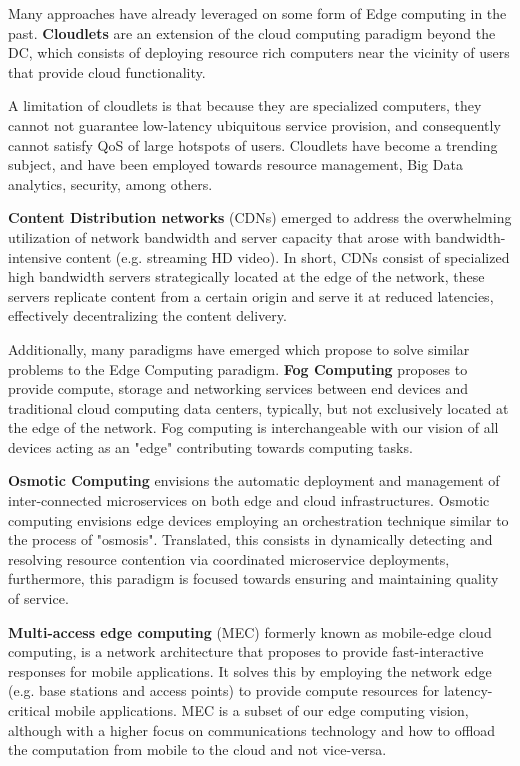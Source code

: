 Many approaches have already leveraged on some form of Edge computing in the past. \textbf{Cloudlets} \cite{10.1145/2307849.2307858} are an extension of the cloud computing paradigm beyond the DC, which consists of deploying resource rich computers near the vicinity of users that provide cloud functionality.

A limitation of cloudlets is that because they are specialized computers, they cannot not guarantee low-latency ubiquitous service provision, and consequently cannot satisfy QoS of large hotspots of users. Cloudlets have become a trending subject, and have been employed towards resource management, Big Data analytics, security, among others.

\textbf{Content Distribution networks} \cite{peng2004cdn} (CDNs) emerged to address the overwhelming utilization of network bandwidth and server capacity that arose with bandwidth-intensive content (e.g. streaming HD video). In short, CDNs consist of specialized high bandwidth servers strategically located at the edge of the network, these servers replicate content from a certain origin and serve it at reduced latencies, effectively decentralizing the content delivery. 

Additionally, many paradigms have emerged which propose to solve similar problems to the Edge Computing paradigm. \textbf{Fog Computing} \cite{bonomi2012fog} proposes to provide compute, storage and networking services between end devices and traditional cloud computing data centers, typically, but not exclusively located at the edge of the network. Fog computing is interchangeable with our vision of all devices acting as an "edge" contributing towards computing tasks.

\textbf{Osmotic Computing} \cite{villari2016osmotic} envisions the automatic deployment and management of inter-connected microservices on both edge and cloud infrastructures. Osmotic computing envisions edge devices employing an orchestration technique similar to the process of "osmosis". Translated, this consists in dynamically detecting and resolving resource contention via coordinated microservice deployments, furthermore, this paradigm is focused towards ensuring and maintaining quality of service.

\textbf{Multi-access edge computing} \cite{mobile_edge_cloud} (MEC) formerly known as mobile-edge cloud computing, is a network architecture that proposes to provide fast-interactive responses for mobile applications. It solves this by employing the network edge (e.g. base stations and access points) to provide compute resources for latency-critical mobile applications. MEC is a subset of our edge computing vision, although with a higher focus on communications technology and how to offload the computation from mobile to the cloud and not vice-versa. 

